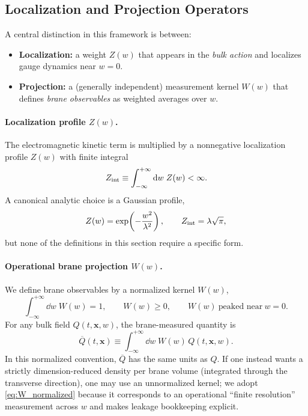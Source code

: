 \documentclass[11pt]{article}
\newcommand{\x}{\mathbf{x}}     %
\newcommand{\Z}{Z}              %
\newcommand{\W}{W}              %
\newcommand{\Proj}[1]{\overline{#1}} %
\newcommand{\Zint}{Z_{\rm int}}
\begin{document}
\subsection{Localization and Projection Operators}
\label{sec:projection_defs}

A central distinction in this framework is between:
\begin{itemize}[leftmargin=1.7em]
\item \textbf{Localization:} a weight \(\Z(w)\) that appears in the \emph{bulk action}
and localizes gauge dynamics near \(w=0\).
\item \textbf{Projection:} a (generally independent) measurement kernel \(\W(w)\)
that defines \emph{brane observables} as weighted averages over \(w\).
\end{itemize}

\paragraph{Localization profile \texorpdfstring{$\Z(w)$}{Z(w)}.}
The electromagnetic kinetic term is multiplied by a nonnegative localization profile
\(\Z(w)\) with finite integral
\begin{equation}
\Zint \equiv \int_{-\infty}^{+\infty}\dd w\;\Z(w) < \infty.
\label{eq:Zint_def}
\end{equation}
A canonical analytic choice is a Gaussian profile,
\begin{equation}
\Z(w)=\exp\!\left(-\frac{w^2}{\lambda^2}\right),
\qquad
\Zint=\lambda\sqrt{\pi},
\label{eq:Z_gaussian_def}
\end{equation}
but none of the definitions in this section require a specific form.

\paragraph{Operational brane projection \texorpdfstring{$\W(w)$}{W(w)}.}
We define brane observables by a normalized kernel \(\W(w)\),
\begin{equation}
\int_{-\infty}^{+\infty}\dd w\;\W(w)=1,
\qquad
\W(w)\ge 0,
\qquad
\W(w)\ \text{peaked near}\ w=0.
\label{eq:W_normalized}
\end{equation}
For any bulk field \(Q(t,\x,w)\), the brane-measured quantity is
\begin{equation}
\Proj{Q}(t,\x) \equiv \int_{-\infty}^{+\infty}\dd w\;\W(w)\,Q(t,\x,w).
\label{eq:brane_projection}
\end{equation}
In this normalized convention, \(\Proj{Q}\) has the same units as \(Q\). If one
instead wants a strictly dimension-reduced density per brane volume (integrated
through the transverse direction), one may use an unnormalized kernel; we adopt
\eqref{eq:W_normalized} because it corresponds to an operational ``finite
resolution'' measurement across \(w\) and makes leakage bookkeeping explicit.
\end{document}

